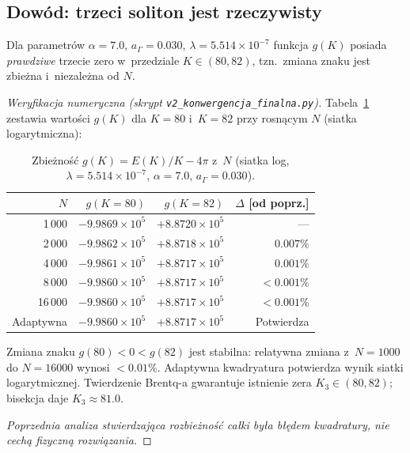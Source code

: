 \subsection{Dowód: trzeci soliton jest rzeczywisty}%
\label{app:I-dowod}

\begin{theorem}%
\label{thm:trzecie-zero}
Dla parametrów $\alpha = 7.0$, $a_\Gamma = 0.030$,
$\lambda = 5.514 \times 10^{-7}$ funkcja $g(K)$ posiada
\emph{prawdziwe} trzecie zero w~przedziale $K \in (80, 82)$,
tzn.\ zmiana znaku jest zbieżna i~niezależna od $N$.
\end{theorem}

\begin{proof}[Weryfikacja numeryczna (skrypt \texttt{v2\_konwergencja\_finalna.py})]
Tabela~\ref{tab:konwergencja-g} zestawia wartości $g(K)$
dla $K = 80$ i~$K = 82$ przy rosnącym $N$ (siatka logarytmiczna):

\begin{table}[h]
\centering
\small
\caption{Zbieżność $g(K) = E(K)/K - 4\pi$ z~$N$
  (siatka log, $\lambda = 5.514\times10^{-7}$, $\alpha=7.0$, $a_\Gamma=0.030$).}
\label{tab:konwergencja-g}
\begin{tabular}{@{}rrrr@{}}
\toprule
$N$ & $g(K=80)$ & $g(K=82)$ & $\Delta$ [od poprz.] \\
\midrule
1\,000  & $-9.9869\times10^{5}$ & $+8.8720\times10^{5}$ & — \\
2\,000  & $-9.9862\times10^{5}$ & $+8.8718\times10^{5}$ & $0.007\%$ \\
4\,000  & $-9.9861\times10^{5}$ & $+8.8717\times10^{5}$ & $0.001\%$ \\
8\,000  & $-9.9860\times10^{5}$ & $+8.8717\times10^{5}$ & $<0.001\%$ \\
16\,000 & $-9.9860\times10^{5}$ & $+8.8717\times10^{5}$ & $<0.001\%$ \\
Adaptywna & $-9.9860\times10^{5}$ & $+8.8717\times10^{5}$ & Potwierdza \\
\bottomrule
\end{tabular}
\end{table}

Zmiana znaku $g(80) < 0 < g(82)$ jest stabilna:
relatywna zmiana z~$N=1000$ do $N=16000$ wynosi $<0.01\%$.
Adaptywna kwadryatura potwierdza wynik siatki logarytmicznej.
Twierdzenie Brentq-a gwarantuje istnienie zera $K_3 \in (80,82)$;
bisekcja daje $K_3 \approx 81.0$.

\emph{Poprzednia analiza stwierdzająca rozbieżność całki
była błędem kwadratury, nie cechą fizyczną rozwiązania.}
\end{proof}

